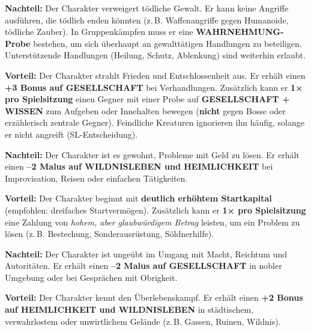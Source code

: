 \begin{traitbox}{}
	
	\textbf{Nachteil:}  
	Der Charakter verweigert tödliche Gewalt.
	Er kann keine Angriffe ausführen, die tödlich enden könnten
	(z.\,B. Waffenangriffe gegen Humanoide, tödliche Zauber).
	In Gruppenkämpfen muss er eine \textbf{WAHRNEHMUNG-Probe} bestehen,
	um sich überhaupt an gewalttätigen Handlungen zu beteiligen. Unterstützende Handlungen (Heilung, Schutz, Ablenkung)
	sind weiterhin erlaubt.
	
	
	\medskip
	\textbf{Vorteil:}  
	Der Charakter strahlt Frieden und Entschlossenheit aus.
	Er erhält einen \textbf{+3 Bonus auf GESELLSCHAFT} bei Verhandlungen.
	Zusätzlich kann er \textbf{1× pro Spielsitzung}
	einen Gegner mit einer Probe auf \textbf{GESELLSCHAFT + WISSEN}
	zum Aufgeben oder Innehalten bewegen
	(\textbf{nicht} gegen Bosse oder erzählerisch zentrale Gegner).
	Feindliche Kreaturen ignorieren ihn häufig,
	solange er nicht angreift (SL-Entscheidung).
	
\end{traitbox}

\begin{traitbox}{}
	
	\textbf{Nachteil:}  
	Der Charakter ist es gewohnt, Probleme mit Geld zu lösen.
	Er erhält einen \textbf{–2 Malus auf WILDNISLEBEN und HEIMLICHKEIT}
	bei Improvisation, Reisen oder einfachen Tätigkeiten.
	
	\medskip
	\textbf{Vorteil:}  
	Der Charakter beginnt mit \textbf{deutlich erhöhtem Startkapital}
	(empfohlen: dreifaches Startvermögen).
	Zusätzlich kann er \textbf{1× pro Spielsitzung}
	eine Zahlung von \emph{hohem, aber glaubwürdigem Betrag} leisten,
	um ein Problem zu lösen
	(z.\,B. Bestechung, Sonderausrüstung, Söldnerhilfe).
	
\end{traitbox}

\begin{traitbox}{}
	
	\textbf{Nachteil:}  
	Der Charakter ist ungeübt im Umgang mit Macht, Reichtum und Autoritäten.
	Er erhält einen \textbf{–2 Malus auf GESELLSCHAFT}
	in nobler Umgebung oder bei Gesprächen mit Obrigkeit.
	
	\medskip
	\textbf{Vorteil:}  
	Der Charakter kennt den Überlebenskampf.
	Er erhält einen \textbf{+2 Bonus auf HEIMLICHKEIT und WILDNISLEBEN}
	in städtischem, verwahrlostem oder unwirtlichem Gelände
	(z.\,B. Gassen, Ruinen, Wildnis).
	
\end{traitbox}

